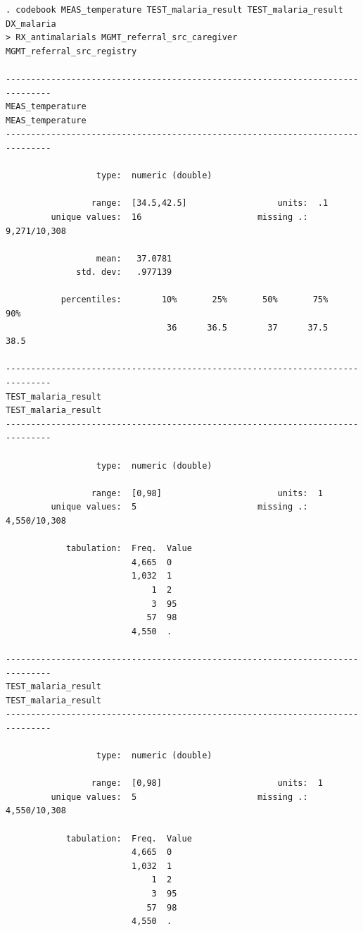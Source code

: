 \documentclass[
  letterpaper,
  DIV=11,
  numbers=noendperiod,
  oneside]{scrreprt}
\begin{document}
\begin{verbatim}
. codebook MEAS_temperature TEST_malaria_result TEST_malaria_result DX_malaria 
> RX_antimalarials MGMT_referral_src_caregiver MGMT_referral_src_registry

-------------------------------------------------------------------------------
MEAS_temperature                                               MEAS_temperature
-------------------------------------------------------------------------------

                  type:  numeric (double)

                 range:  [34.5,42.5]                  units:  .1
         unique values:  16                       missing .:  9,271/10,308

                  mean:   37.0781
              std. dev:   .977139

           percentiles:        10%       25%       50%       75%       90%
                                36      36.5        37      37.5      38.5

-------------------------------------------------------------------------------
TEST_malaria_result                                         TEST_malaria_result
-------------------------------------------------------------------------------

                  type:  numeric (double)

                 range:  [0,98]                       units:  1
         unique values:  5                        missing .:  4,550/10,308

            tabulation:  Freq.  Value
                         4,665  0
                         1,032  1
                             1  2
                             3  95
                            57  98
                         4,550  .

-------------------------------------------------------------------------------
TEST_malaria_result                                         TEST_malaria_result
-------------------------------------------------------------------------------

                  type:  numeric (double)

                 range:  [0,98]                       units:  1
         unique values:  5                        missing .:  4,550/10,308

            tabulation:  Freq.  Value
                         4,665  0
                         1,032  1
                             1  2
                             3  95
                            57  98
                         4,550  .


\end{verbatim}
\end{document}
